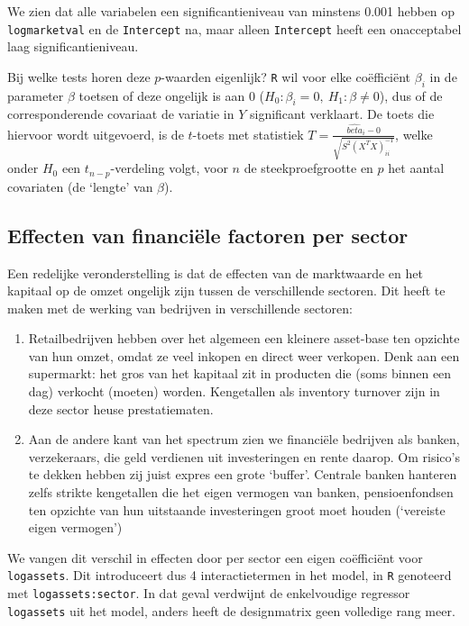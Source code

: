 \documentclass[a4paper, notitlepage]{report}
\begin{document}
  We zien dat alle variabelen een significantieniveau van minstens 0.001 hebben op \verb!logmarketval! en de \verb!Intercept! na, maar alleen \verb!Intercept! heeft een onacceptabel laag significantieniveau. 
  
  Bij welke tests horen deze $p$-waarden eigenlijk? \verb!R! wil voor elke co\"effici\"ent $\beta_i$ in de parameter $\beta$ toetsen of deze ongelijk is aan 0 ($H_0:\beta_i = 0, \ H_1:\beta \neq 0$), dus of de corresponderende covariaat de variatie in $Y$ significant verklaart. De toets die hiervoor wordt uitgevoerd, is de $t$-toets met statistiek $T = \frac{ \hat{beta}_i - 0}{\sqrt{S^2(X^TX)^{-1}_{ii}}}$, welke onder $H_0$ een $t_{n-p}$-verdeling volgt, voor $n$ de steekproefgrootte en $p$ het aantal covariaten (de `lengte' van $\beta$).
  
\subsection{Effecten van financi\"ele factoren per sector}
  Een redelijke veronderstelling is dat de effecten van de marktwaarde en het kapitaal op de omzet ongelijk zijn tussen de verschillende sectoren. Dit heeft te maken met de werking van bedrijven in verschillende sectoren: 

  \begin{enumerate}
    \item Retailbedrijven hebben over het algemeen een kleinere asset-base ten opzichte van hun omzet, omdat ze veel inkopen en direct weer verkopen. Denk aan een supermarkt: het gros van het kapitaal zit in producten die (soms binnen een dag) verkocht (moeten) worden. Kengetallen als inventory turnover zijn in deze sector heuse prestatiematen.
    
    \item Aan de andere kant van het spectrum zien we financi\"ele bedrijven als banken, verzekeraars, die geld verdienen uit investeringen en rente daarop. Om risico's te dekken hebben zij juist expres een grote `buffer'. Centrale banken hanteren zelfs strikte kengetallen die het eigen vermogen van banken, pensioenfondsen ten opzichte van hun uitstaande investeringen groot moet houden (`vereiste eigen vermogen')
\end{enumerate} 
  
  We vangen dit verschil in effecten door per sector een eigen co\"effici\"ent voor \verb!logassets!. Dit introduceert dus 4 interactietermen in het model, in \verb!R! genoteerd met \verb!logassets:sector!. In dat geval verdwijnt de enkelvoudige regressor \verb!logassets! uit het model, anders heeft de designmatrix geen volledige rang meer.
  
\end{document}
